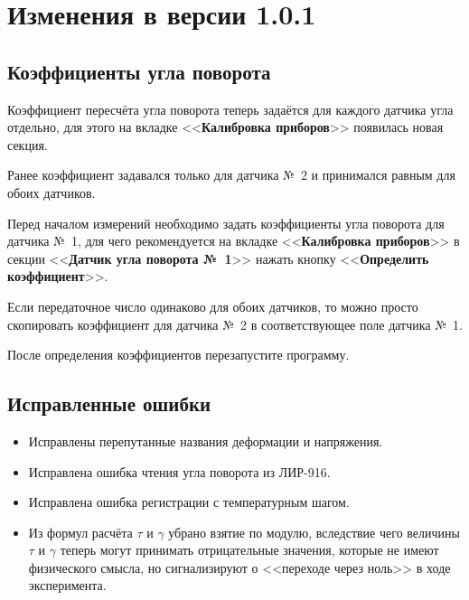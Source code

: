 \documentclass[12pt, a4paper]{article}
\newcommand{\CTRL}[1]{<<{\bf #1}>>}
\begin{document}
\section*{Изменения в версии 1.0.1}

\subsection*{Коэффициенты угла поворота}

Коэффициент пересчёта угла поворота теперь задаётся для каждого датчика угла отдельно, для этого на вкладке \CTRL{Калибровка приборов} появилась новая секция.

Ранее коэффициент задавался только для датчика №~2 и принимался равным для обоих датчиков.

Перед началом измерений необходимо задать коэффициенты угла поворота для датчика №~1, для чего рекомендуется на вкладке \CTRL{Калибровка приборов} в секции \CTRL{Датчик угла поворота №~1} нажать кнопку \CTRL{Определить коэффициент}.

Если передаточное число одинаково для обоих датчиков, то можно просто скопировать коэффициент для датчика №~2 в соответствующее поле датчика №~1.

После определения коэффициентов перезапустите программу.

\subsection*{Исправленные ошибки}

\begin{itemize}
\item Исправлены перепутанные названия деформации и напряжения.
\item Исправлена ошибка чтения угла поворота из ЛИР-916.
\item Исправлена ошибка регистрации с температурным шагом.
\item Из формул расчёта $\tau$ и $\gamma$ убрано взятие по модулю, вследствие чего величины $\tau$ и $\gamma$ теперь могут принимать отрицательные значения, которые не имеют физического смысла, но сигнализируют о <<переходе через ноль>> в ходе эксперимента.
\end{itemize}
\end{document}
